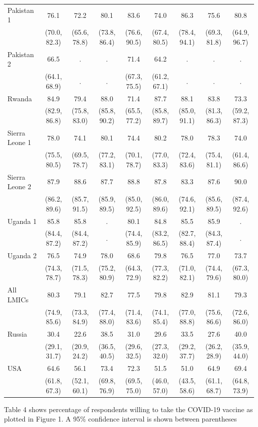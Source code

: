 \documentclass[
  12pt,
]{article}
\providecommand{\DIFaddendFL}{} %
\DeclareRobustCommand{\DIFaddendFL}{\DIFOaddendFL \let\includegraphics\DIFOincludegraphics} %
\begin{document}
\begin{table}[!h]
{\begin{threeparttable}
\begin{tabular}[t]{lcccccccc}
Pakistan 1 & 76.1 & 72.2 & 80.1 & 83.6 & 74.0 & 86.3 & 75.6 & 80.8\\
 & (70.0, 82.3) & (65.6, 78.8) & (73.8, 86.4) & (76.6, 90.5) & (67.4, 80.5) & (78.4, 94.1) & (69.3, 81.8) & (64.9, 96.7)\\
Pakistan 2 & 66.5 & . & . & 71.4 & 64.2 & . & . & .\\
 & (64.1, 68.9) & . & . & (67.3, 75.5) & (61.2, 67.1) & . & . & .\\
Rwanda & 84.9 & 79.4 & 88.0 & 71.4 & 87.7 & 88.1 & 83.8 & 73.3\\
 & (82.9, 86.8) & (75.8, 83.0) & (85.8, 90.2) & (65.5, 77.2) & (85.8, 89.7) & (85.0, 91.1) & (81.3, 86.3) & (59.2, 87.3)\\
Sierra Leone 1 & 78.0 & 74.1 & 80.1 & 74.4 & 80.2 & 78.0 & 78.3 & 74.0\\
 & (75.5, 80.5) & (69.5, 78.7) & (77.2, 83.1) & (70.1, 78.7) & (77.0, 83.3) & (72.4, 83.6) & (75.4, 81.1) & (61.4, 86.6)\\
Sierra Leone 2 & 87.9 & 88.6 & 87.7 & 88.8 & 87.8 & 83.3 & 87.6 & 90.0\\
 & (86.2, 89.6) & (85.7, 91.5) & (85.9, 89.5) & (85.0, 92.5) & (86.0, 89.6) & (74.6, 92.1) & (85.6, 89.5) & (87.4, 92.6)\\
Uganda 1 & 85.8 & 85.8 & . & 80.1 & 84.8 & 85.5 & 85.9 & .\\
 & (84.4, 87.2) & (84.4, 87.2) & . & (74.4, 85.9) & (83.2, 86.5) & (82.7, 88.4) & (84.3, 87.4) & .\\
Uganda 2 & 76.5 & 74.9 & 78.0 & 68.6 & 79.8 & 76.5 & 77.0 & 73.7\\
 & (74.3, 78.7) & (71.5, 78.3) & (75.2, 80.9) & (64.3, 72.9) & (77.3, 82.2) & (71.0, 82.1) & (74.4, 79.6) & (67.3, 80.0)\\
All LMICs & 80.3 & 79.1 & 82.7 & 77.5 & 79.8 & 82.9 & 81.1 & 79.3\\
 & (74.9, 85.6) & (73.3, 84.9) & (77.4, 88.0) & (71.4, 83.6) & (74.1, 85.4) & (77.0, 88.8) & (75.6, 86.6) & (72.6, 86.0)\\
Russia & 30.4 & 22.6 & 38.5 & 31.0 & 29.6 & 33.5 & 27.6 & 40.0\\
 & (29.1, 31.7) & (20.9, 24.2) & (36.5, 40.5) & (29.6, 32.5) & (27.3, 32.0) & (29.2, 37.7) & (26.2, 28.9) & (35.9, 44.0)\\
USA & 64.6 & 56.1 & 73.4 & 72.3 & 51.5 & 51.0 & 64.9 & 69.4\\
 & (61.8, 67.3) & (52.1, 60.1) & (69.8, 76.9) & (69.5, 75.0) & (46.0, 57.0) & (43.5, 58.6) & (61.1, 68.7) & (64.8, 73.9)\\
\bottomrule
\end{tabular}
\begin{tablenotes}
\item Table 4 shows percentage of respondents willing to take the COVID-19 vaccine as plotted in Figure 1. A 95\% confidence interval is shown between parentheses
\end{tablenotes}
\end{threeparttable}}
\DIFaddendFL \end{table}
\end{document}
